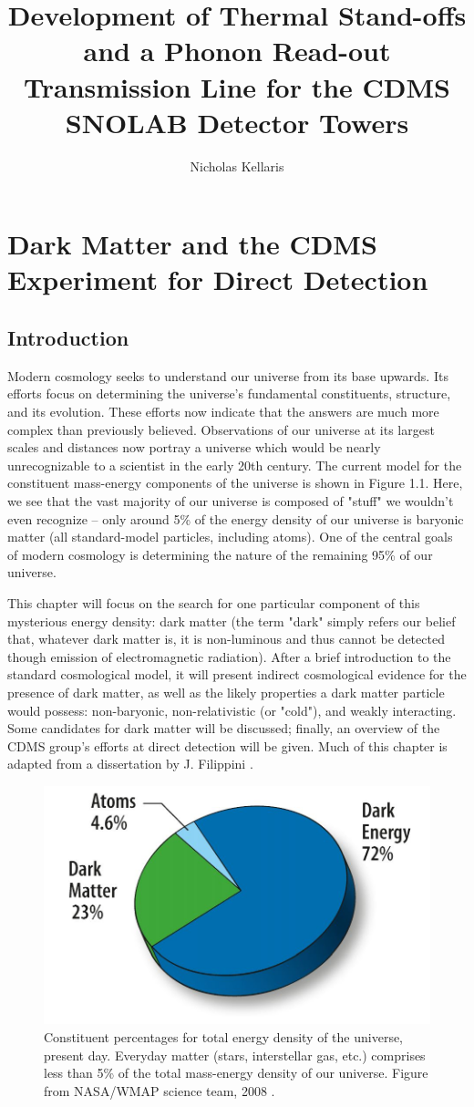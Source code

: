 \documentclass{report}
\title{Development of Thermal Stand-offs and a Phonon Read-out Transmission Line for the CDMS SNOLAB Detector Towers}
\author{Nicholas Kellaris}
\begin{document}

\maketitle

\tableofcontents

\chapter{Dark Matter and the CDMS Experiment for Direct Detection}

\section{Introduction}

Modern cosmology seeks to understand our universe from its base upwards. Its efforts focus on determining the universe's fundamental constituents, structure, and its evolution. These efforts now indicate that the answers are much more complex than previously believed. Observations of our universe at its largest scales and distances now portray a universe which would be nearly unrecognizable to a scientist in the early 20th century. The current model for the constituent mass-energy components of the universe is shown in Figure 1.1. Here, we see that the vast majority of our universe is composed of "stuff" we wouldn't even recognize -- only around 5\% of the energy density of our universe is baryonic matter (all standard-model particles, including atoms). One of the central goals of modern cosmology is determining the nature of the remaining 95\% of our universe.

This chapter will focus on the search for one particular component of this mysterious energy density: dark matter (the term "dark" simply refers our belief that, whatever dark matter is, it is non-luminous and thus cannot be detected though emission of electromagnetic radiation). After a brief introduction to the standard cosmological model, it will present indirect cosmological evidence for the presence of dark matter, as well as the likely properties a dark matter particle would possess: non-baryonic, non-relativistic (or "cold"), and weakly interacting. Some candidates for dark matter will be discussed; finally, an overview of the CDMS group's efforts at direct detection will be given. Much of this chapter is adapted from a dissertation by J. Filippini \cite{Filippini2008}.

\begin{figure}[h]
\centering
\includegraphics[width = .4\textwidth]{Pie_chart_universe.jpg}
\caption{Constituent percentages for total energy density of the universe, present day. Everyday matter (stars, interstellar gas, etc.) comprises less than 5\% of the total mass-energy density of our universe. Figure from NASA/WMAP science team, 2008 \cite{WMAP}.}
\end{figure}
\end{document}
